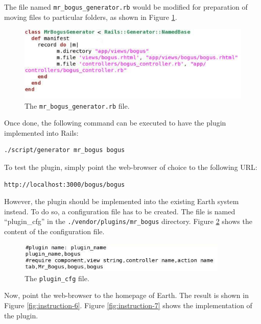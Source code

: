 \documentclass{article}
\begin{document}
The file named \texttt{mr\_bogus\_generator.rb} would be modified for preparation of moving files to particular folders, as shown in Figure \ref{fig:instruction-5}.

\begin{figure}
    \begin{centering}    
    \includegraphics[width=120mm]{fig/instruction-5}
    \end{centering}
    \caption{The \texttt{mr\_bogus\_generator.rb} file.}
    \label{fig:instruction-5}
\end{figure}

Once done, the following command can be executed to have the plugin implemented into Rails: 

\begin{verbatim}
./script/generator mr_bogus bogus
\end{verbatim}

To test the plugin, simply point the web-browser of choice to the following URL:

\begin{verbatim}
http://localhost:3000/bogus/bogus
\end{verbatim}

However, the plugin should be implemented into the existing Earth system instead. To do so, a configuration file has to be created. The file is named ``plugin\_cfg'' in the \texttt{./vendor/plugins/mr\_bogus} directory. Figure \ref{fig:asd} shows the content of the configuration file.

\begin{figure}
\begin{centering}        
\includegraphics[width=100mm]{fig/asd}
\end{centering}
\caption{The \texttt{plugin\_cfg} file.}
\label{fig:asd}
\end{figure}

Now, point the web-browser to the homepage of Earth. The result is shown in Figure \ref{fig:instruction-6}. Figure \ref{fig:instruction-7} shows the implementation of the plugin.
\end{document}
